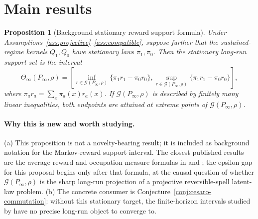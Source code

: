 \documentclass[11pt]{article}
\theoremstyle{definition}
\theoremstyle{plain}
\newtheorem{proposition}{Proposition}
\theoremstyle{remark}
\begin{document}
\section{Main results}
\begin{proposition}[Background stationary reward support formula]\label{thm:stationary-reward}
Under Assumptions~\ref{ass:projective}--\ref{ass:compatible}, suppose further that the sustained-regime kernels \(Q_1,Q_0\) have stationary laws \(\pi_1,\pi_0\).  Then the stationary long-run support set is the interval
\[
\Theta_{\infty}(P_{\infty},\rho)
=\left[
\inf_{r\in\mathcal G(P_{\infty},\rho)}
  \{\pi_1 r_1-\pi_0 r_0\},
\sup_{r\in\mathcal G(P_{\infty},\rho)}
  \{\pi_1 r_1-\pi_0 r_0\}
\right],
\]
where \(\pi_a r_a=\sum_x\pi_a(x)r_a(x)\).  If \(\mathcal G(P_{\infty},\rho)\) is described by finitely many linear inequalities, both endpoints are attained at extreme points of \(\mathcal G(P_{\infty},\rho)\).
\end{proposition}

\paragraph{Why this is new and worth studying.}
(a) This proposition is not a novelty-bearing result; it is included as background notation for the Markov-reward support interval.  The closest published results are the average-reward and occupation-measure formulas in \citet{Puterman1994} and \citet{Altman1999}; the epsilon-gap for this proposal begins only after that formula, at the causal question of whether \(\mathcal G(P_\infty,\rho)\) is the sharp long-run projection of a projective reversible-spell latent-law problem.  (b) The concrete consumer is Conjecture~\ref{conj:cesaro-commutation}: without this stationary target, the finite-horizon intervals studied by \citet{Han2021} have no precise long-run object to converge to.
\end{document}
